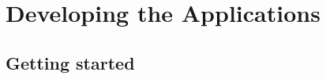 
\chapter{Developing the Applications}
\label{intro04} %


\section{Getting started}
\label{sec:04:1}

